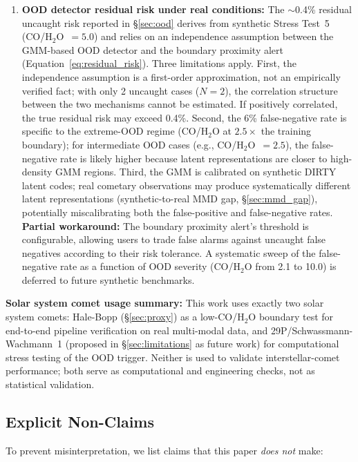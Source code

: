 \documentclass[usenatbib]{mnras}
\begin{document}
\begin{enumerate}
    \item \textbf{OOD detector residual risk under real conditions:} The $\sim$0.4\% residual uncaught risk reported in \S\ref{sec:ood} derives from synthetic Stress Test~5 (CO/H$_2$O~$=5.0$) and relies on an independence assumption between the GMM-based OOD detector and the boundary proximity alert (Equation~\ref{eq:residual_risk}). Three limitations apply. First, the independence assumption is a first-order approximation, not an empirically verified fact; with only 2 uncaught cases ($N=2$), the correlation structure between the two mechanisms cannot be estimated. If positively correlated, the true residual risk may exceed 0.4\%. Second, the 6\% false-negative rate is specific to the extreme-OOD regime (CO/H$_2$O at $2.5\times$ the training boundary); for intermediate OOD cases (e.g., CO/H$_2$O~$=2.5$), the false-negative rate is likely higher because latent representations are closer to high-density GMM regions. Third, the GMM is calibrated on synthetic DIRTY latent codes; real cometary observations may produce systematically different latent representations (synthetic-to-real MMD gap, \S\ref{sec:mmd_gap}), potentially miscalibrating both the false-positive and false-negative rates. \textbf{Partial workaround:} The boundary proximity alert's threshold is configurable, allowing users to trade false alarms against uncaught false negatives according to their risk tolerance. A systematic sweep of the false-negative rate as a function of OOD severity (CO/H$_2$O from 2.1 to 10.0) is deferred to future synthetic benchmarks.
\end{enumerate}

\textbf{Solar system comet usage summary:} This work uses exactly two solar system comets: Hale-Bopp (\S\ref{sec:proxy}) as a low-CO/H$_2$O boundary test for end-to-end pipeline verification on real multi-modal data, and 29P/Schwassmann-Wachmann~1 (proposed in \S\ref{sec:limitations} as future work) for computational stress testing of the OOD trigger. Neither is used to validate interstellar-comet performance; both serve as computational and engineering checks, not as statistical validation.

\subsection{Explicit Non-Claims}\label{sec:non_claims}

To prevent misinterpretation, we list claims that this paper \textit{does not} make:
\end{document}
